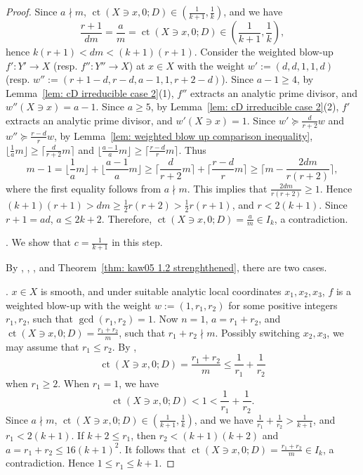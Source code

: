 \documentclass[11pt]{amsart}
\numberwithin{equation}{section}
\newcommand{\ct}{\operatorname{ct}}
\theoremstyle{definition}
\theoremstyle{definition}
\begin{document}
\begin{proof}
Since $a\nmid m$, $\ct(X\ni x,0;D)\in (\frac{1}{k+1},\frac{1}{k})$, and we have $$\frac{r+1}{dm}=\frac{a}{m}=\ct(X\ni x,0; D)\in (\frac{1}{k+1},\frac{1}{k}),$$ hence $k(r+1)<dm<(k+1)(r+1)$. Consider the weighted blow-up $f': Y'\to X$ (resp. $f'': Y''\to X$) at $x\in X$ with the weight $w':=(d,d,1,1,d)$ (resp. $w'':=(r+1-d,r-d,a-1,1,r+2-d)$). Since $a-1\geq 4$, by Lemma~\ref{lem: cD irreducible case 2}(1), $f''$ extracts an analytic prime divisor, and $w''(X\ni x)=a-1$. Since $a\geq 5$, by Lemma~\ref{lem: cD irreducible case 2}(2), $f'$ extracts an analytic prime divisor, and $w'(X\ni x)=1$. Since $w'\succeq \frac{d}{r+2}w$ and $w''\succeq \frac{r-d}{r}w$, by Lemma~\ref{lem: weighted blow up comparison inequality}, $\lfloor\frac{1}{a}m\rfloor\geq\lceil\frac{d}{r+2}m\rceil$ and $\lfloor\frac{a-1}{a}m\rfloor\geq\lceil\frac{r-d}{r}m\rceil$. Thus $$m-1=\lfloor\frac{1}{a}m\rfloor+\lfloor\frac{a-1}{a}m\rfloor\geq \lceil\frac{d}{r+2}m\rceil+\lceil\frac{r-d}{r}m\rceil\geq \lceil m-\frac{2dm}{r(r+2)}\rceil,$$ where the first equality follows from $a\nmid m$. This implies that $\frac{2dm}{r(r+2)}\geq 1$. Hence $(k+1)(r+1)>dm\geq \frac{1}{2}r(r+2)>\frac{1}{2}r(r+1)$, and $r<2(k+1)$. Since $r+1=ad$, $a\leq 2k+2$. Therefore, $\ct(X\ni x,0; D)=\frac{a}{m}\in I_k$, a contradiction.

\medskip

. We show that $c=\frac{1}{k+1}$ in this step. 

By , , \cite[Theorem~1.1]{Kaw01}, and Theorem~\ref{thm: kaw05 1.2 strenghthened}, there are two cases. 

\medskip

. $x\in X$ is smooth, and under suitable analytic local coordinates $x_1,x_2,x_3$, $f$ is a weighted blow-up with the weight $w:=(1,r_1,r_2)$ for some positive integers $r_1,r_2$, such that $\gcd(r_1,r_2)=1$. Now $n=1$, $a=r_1+r_2$, and $\ct(X\ni x,0;D)=\frac{r_1+r_2}{m}$, such that $r_1+r_2\nmid m$. Possibly switching $x_2,x_3$, we may assume that $r_1\leq r_2$. By \cite[Proposition~3.3(1)]{Che19}, $$\ct(X\ni x,0;D)=\frac{r_1+r_2}{m}\leq \frac{1}{r_1}+\frac{1}{r_2}$$
when $r_1\geq 2$. When $r_1=1$, we have
$$\ct(X\ni x,0;D)<1<\frac{1}{r_1}+\frac{1}{r_2}.$$
Since $a\nmid m$, $\ct(X\ni x,0;D)\in (\frac{1}{k+1},\frac{1}{k})$, and we have $\frac{1}{r_1}+\frac{1}{r_2}>\frac{1}{k+1}$, and $r_1<2(k+1)$. If $k+2\leq r_1$, then $r_2< (k+1)(k+2)$ and $a=r_1+r_2\leq 16(k+1)^2$. It follows that $\ct(X\ni x,0;D)=\frac{r_1+r_2}{m}\in I_k$, a contradiction. Hence $1\leq r_1\leq k+1$.


\end{proof}
\end{document}
